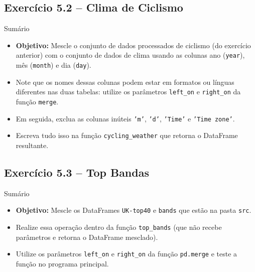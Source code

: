 \documentclass[11pt,a4paper]{article}
\begin{document}
\subsection*{Exercício 5.2 -- Clima de Ciclismo}
\begin{exercicio}{Sumário}
\begin{itemize}
    \item \textbf{Objetivo:} Mescle o conjunto de dados processados de ciclismo (do exercício anterior) com o conjunto de dados de clima usando as colunas ano (\texttt{year}), mês (\texttt{month}) e dia (\texttt{day}).
    \item Note que os nomes dessas colunas podem estar em formatos ou línguas diferentes nas duas tabelas: utilize os parâmetros \texttt{left\_on} e \texttt{right\_on} da função \texttt{merge}.
    \item Em seguida, exclua as colunas inúteis \texttt{'m'}, \texttt{'d'}, \texttt{'Time'} e \texttt{'Time zone'}.
    \item Escreva tudo isso na função \texttt{cycling\_weather} que retorna o DataFrame resultante.
\end{itemize}
\end{exercicio}

\subsection*{Exercício 5.3 -- Top Bandas}
\begin{exercicio}{Sumário}
\begin{itemize}
    \item \textbf{Objetivo:} Mescle os DataFrames \texttt{UK-top40} e \texttt{bands} que estão na pasta \texttt{src}.
    \item Realize essa operação dentro da função \texttt{top\_bands} (que não recebe parâmetros e retorna o DataFrame mesclado).
    \item Utilize os parâmetros \texttt{left\_on} e \texttt{right\_on} da função \texttt{pd.merge} e teste a função no programa principal.
\end{itemize}
\end{exercicio}
\end{document}
